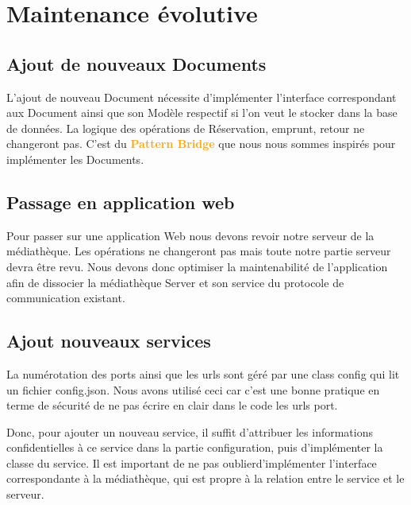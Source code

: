 \chapter*{Maintenance évolutive}

\section{Ajout de nouveaux Documents}

\bigskip

L’ajout de nouveau Document nécessite d’implémenter l’interface correspondant aux Document ainsi que son
Modèle respectif si l'on veut le stocker dans la base de données.
La logique des opérations de Réservation, emprunt, retour ne changeront pas. C’est du \textbf{\textcolor{orange}{Pattern Bridge}} que nous nous sommes
inspirés pour implémenter les Documents.

\bigskip

\section{Passage en application web}

\bigskip

Pour passer sur une application Web nous devons revoir notre serveur de la médiathèque. Les opérations ne changeront pas mais
toute notre partie serveur devra être revu. Nous devons donc optimiser la maintenabilité de l’application afin de dissocier la médiathèque Server et son service du protocole de communication existant.

\bigskip

\section{Ajout nouveaux services}

\bigskip

La numérotation des ports ainsi que les urls sont géré par une class config qui lit un fichier config.json.
Nous avons utilisé ceci car c’est une bonne pratique en terme de sécurité de ne pas écrire en clair dans le code les urls port.

Donc, pour ajouter un nouveau service, il suffit d'attribuer les informations confidentielles à ce service dans la partie configuration, puis d'implémenter la classe du service. Il est important de ne pas oublierd'implémenter l'interface correspondante à la médiathèque, qui est propre à la relation entre le service et le serveur.

